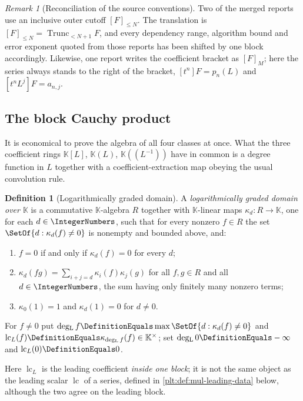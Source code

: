 \documentclass[11pt,oneside]{article}
\theoremstyle{plain}
\theoremstyle{definition}
\newtheorem{definition}[theorem]{Definition}
\theoremstyle{remark}
\newtheorem{remark}[theorem]{Remark}
\newcommand{\K}{\mathbb{K}}
\DeclareMathOperator{\lc}{lc}
\DeclareMathOperator{\degL}{deg_{L}}
\newcommand{\Trunc}[2]{\operatorname{Trunc}_{<#2}#1}     %
\begin{document}
\begin{remark}[Reconciliation of the source conventions]
\label{plt:rmk:mul-conventions}
Two of the merged reports use an inclusive outer cutoff $[F]_{\le N}$.  The
translation is $[F]_{\le N}=\Trunc{F}{N+1}$, and every dependency range,
algorithm bound and error exponent quoted from those reports has been shifted
by one block accordingly.  Likewise, one report writes the coefficient
bracket as $[F]_M$; here the series always stands to the right of the
bracket, $[t^n]F=p_n(L)$ and $[t^nL^j]F=a_{n,j}$.
\end{remark}

\subsection{The block Cauchy product}
\label{plt:sec:mul-cauchy}

It is economical to prove the algebra of all four classes at once.  What the
three coefficient rings $\K[L]$, $\K(L)$, $\K((L^{-1}))$ have in common is a
degree function in $L$ together with a coefficient-extraction map obeying the
usual convolution rule.

\begin{definition}[Logarithmically graded domain]
\label{plt:def:mul-graded-domain}
A \emph{logarithmically graded domain over $\K$} is a commutative
$\K$-algebra $R$ together with $\K$-linear maps
$\kappa_d\colon R\to\K$, one for each $d\in\IntegerNumbers$, such that
for every nonzero $f\in R$ the set $\SetOf{d:\kappa_d(f)\ne0}$ is nonempty
and bounded above, and:
\begin{enumerate}
\item[(G1)] $f=0$ if and only if $\kappa_d(f)=0$ for every $d$;
\item[(G2)] $\kappa_d(fg)=\sum_{i+j=d}\kappa_i(f)\kappa_j(g)$ for all
$f,g\in R$ and all $d\in\IntegerNumbers$, the sum having only finitely many
nonzero terms;
\item[(G3)] $\kappa_0(1)=1$ and $\kappa_d(1)=0$ for $d\ne0$.
\end{enumerate}
For $f\ne0$ put $\degL f\DefinitionEquals\max\SetOf{d:\kappa_d(f)\ne0}$ and
$\lc_L(f)\DefinitionEquals\kappa_{\degL f}(f)\in\K^\times$; set
$\degL 0\DefinitionEquals-\infty$ and $\lc_L(0)\DefinitionEquals0$.
\end{definition}

Here $\lc_L$ is the leading coefficient \emph{inside one block}; it is not
the same object as the leading scalar $\lc$ of a series, defined in
\cref{plt:def:mul-leading-data} below, although the two agree on the leading
block.
\end{document}
